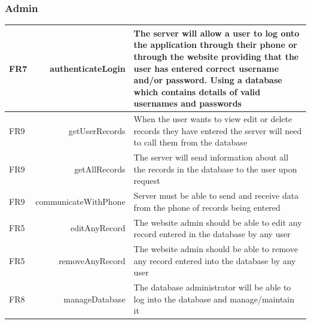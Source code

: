 	\subsubsection{Admin}
	\begin{tabular}{| l  r | p{10cm} |}
		\hline
		FR7 & authenticateLogin  & The server will allow a user to log onto the application through their phone or through the website providing that the user has entered correct username and/or password. Using a database which contains details of valid usernames and passwords \\ \hline
		FR9 & getUserRecords  & When the user wants to view edit or delete records they have entered the server will need to call them from the database \\ \hline
		FR9 & getAllRecords  & The server will send information about all the records in the database to the user upon request \\ \hline
		FR9 & communicateWithPhone  & Server must be able to send and receive data from the phone of records being entered \\ \hline
		FR5 & editAnyRecord  & The website admin should be able to edit any record entered in the database by any user \\ \hline
		FR5 & removeAnyRecord  & The website admin should be able to remove any record entered into the database by any user \\ \hline
		FR8 & manageDatabase  & The database administrator will be able to log into the database and manage/maintain it \\ \hline
	\end{tabular}
